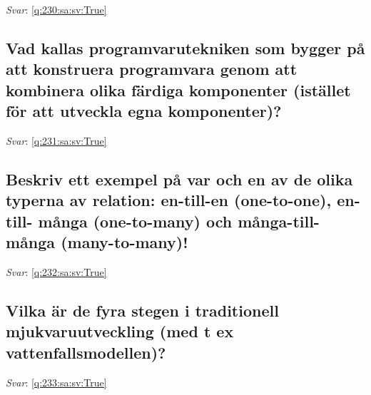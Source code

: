 \documentclass[a4paper,11pt,oneside]{article}
\begin{document}
\begin{sloppypar}
\vspace{1cm}

\textit{Svar}: \autoref{q:230:sa:sv:True}



\subsection{Vad kallas programvarutekniken som bygger p\r{a} att konstruera programvara genom att kombinera olika f\"ardiga komponenter (ist\"allet f\"or att utveckla egna komponenter)?}

\label{q:231:sa:sv:False}

\vspace{2cm}

\noindent\makebox[\textwidth]{\hrulefill}

\vspace{1cm}

\textit{Svar}: \autoref{q:231:sa:sv:True}



\subsection{Beskriv ett exempel p\r{a} var och en av de olika typerna av relation: en-till-en (one-to-one), en-till- m\r{a}nga (one-to-many) och m\r{a}nga-till-m\r{a}nga (many-to-many)!}

\label{q:232:sa:sv:False}

\vspace{2cm}

\noindent\makebox[\textwidth]{\hrulefill}

\vspace{1cm}

\textit{Svar}: \autoref{q:232:sa:sv:True}



\subsection{Vilka \"ar de fyra stegen i traditionell mjukvaruutveckling (med t ex vattenfallsmodellen)?}

\label{q:233:sa:sv:False}

\vspace{2cm}

\noindent\makebox[\textwidth]{\hrulefill}

\vspace{1cm}

\textit{Svar}: \autoref{q:233:sa:sv:True}




\end{sloppypar}
\end{document}
